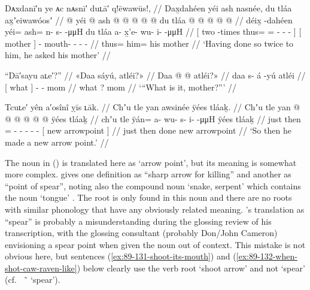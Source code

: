 \ex\label{ex:89-124-twice-ask-mother}%
%
\begingl
	\glpreamble	Dᴀxdanī′n ye ᴀc nᴀsnī′ duʟā′ q!ēwawūs!, //
	\glpreamble	Dax̱dahéen yéi ash nasnée, du tláa ax̱ʼeiwawóosʼ //
	\gla	{}  @ {}
			yéi @ ash @  @ {} @ {} @ {} @ {} {}
		{} du tláa {}
		 @ {} @ {} @ {} @ {} @ {} //
	\glb	{} déix̱ -dahéen
			yéi= ash= n- s-  -μμH {} {}
		{} du tláa {}
		a- x̱'e- wu- i-  -μμH //
	\glc	{}[ two -times
			thus= = - -  - \· {}]
		{}[  mother {}]
		- mouth- - -  - //
	\gld	{}  {}
			thus= him=  {} {} {} {} {}
		{} his mother {}
		 {} {} {} {} {} //
	\glft	‘Having done so twice to him, he asked his mother’
		//
\endgl
\xe

\ex\label{ex:89-125-what-is-it}%
%
\begingl
	\glpreamble	“Dā′sayu aʟe′?” //
	\glpreamble	«\!Daa sáyú, atléi?\!» //
	\gla	{} Daa {}  @ {} @ {}
		atléi?\!» //
	\glb	{} daa {} s- á -yú
		atléi //
	\glc	{}[ what {}] -  -
		mom //
	\gld	{} what {} ?
 {}
		mom //
	\glft	‘“What is it, mother?”’
		//
\endgl
\xe

\ex\label{ex:89-126-made-new-point}%
%
\begingl
	\glpreamble	Tcuʟe′ yên a′osînî ỵīs ʟāk. //
	\glpreamble	Chʼu tle yan awsinée ÿées tláaḵ. //
	\gla	Chʼu tle yan @  @ {} @ {} @ {} @ {} @ {}
		{} ÿées tláaḵ {} //
	\glb	chʼu tle ÿán= a- wu- s- i-  -μμH
		{} ÿées tláaḵ {} //
	\glc	just then = - - - -  -
		{}[ new arrowpoint {}] //
	\gld	just then done  {} {} {} {} {}
		{} new arrowpoint {} //
	\glft	‘So then he made a new arrow point.’
		//
\endgl
\xe

The noun  in (\lastx) is translated here as ‘arrow point’, but its meaning is somewhat more complex.
\citeauthor{leer:1973} gives one definition as “sharp arrow for killing” and another as “point of spear”, noting also the compound noun  ‘snake, serpent’ which contains the noun  ‘tongue’ \parencite[08/138]{leer:1973}.
The root  is only found in this noun and there are no roots with similar phonology that have any obviously related meaning.
\citeauthor{swanton:1909}’s translation as “spear” is probably a misunderstanding during the glossing review of his transcription, with the glossing consultant (probably  Don/John Cameron) envisioning a spear point when given the noun  out of context.
This mistake is not obvious here, but sentences (\ref{ex:89-131-shoot-its-mouth}) and (\ref{ex:89-132-when-shot-caw-raven-like}) below clearly use the verb root  ‘shoot arrow’ and not  ‘spear’ (cf.\  \~\  ‘spear’).


